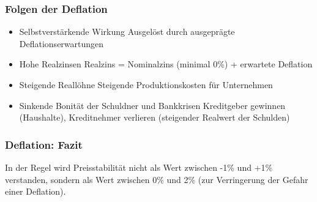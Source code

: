 \subsubsection{Folgen der Deflation}
\begin{itemize}
    \item Selbstverstärkende Wirkung
    \subitem Ausgelöst durch ausgeprägte Deflationserwartungen
    \item Hohe Realzinsen
    \subitem Realzins = Nominalzins (minimal 0\%) + erwartete Deflation
    \item Steigende Reallöhne
    \subitem Steigende Produktionskosten für Unternehmen
    \item Sinkende Bonität der Schuldner und Bankkrisen
    \subitem Kreditgeber gewinnen (Haushalte), Kreditnehmer verlieren (steigender Realwert der Schulden)
\end{itemize}

\subsubsection{Deflation: Fazit}
In der Regel wird Preisstabilität nicht als Wert zwischen -1\% und +1\% verstanden, sondern als Wert zwischen 0\% und 2\% (zur Verringerung der Gefahr einer Deflation).

\clearpage
\pagebreak